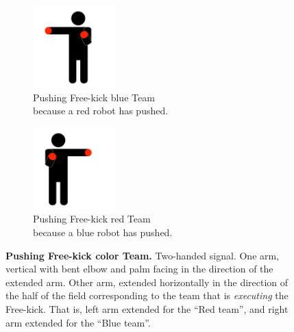 \begin{figure}[ht!]
    \centering
    \begin{subfigure}{.33\textwidth}
        \centering
        \includegraphics[height=120px]{figs/technical_challenges/pushing.png}
        \caption{{\color{blue}Pushing Free-kick \textlangle{}blue\textrangle{} Team}\\ because a {\color{red}red} robot has pushed.}
    \end{subfigure}
    \begin{subfigure}{.33\textwidth}
        \centering
        \includegraphics[height=120px]{figs/technical_challenges/pushing-flipped.png}
        \caption{{\color{red}Pushing Free-kick \textlangle{}red\textrangle{} Team}\\ because a {\color{blue}blue} robot has pushed.}
    \end{subfigure}
    \caption{\textbf{Pushing Free-kick \textlangle{}color\textrangle{} Team.} Two-handed signal. One arm, vertical with bent elbow and palm facing in the direction of the extended arm. Other arm, extended horizontally in the direction of the half of the field corresponding to the team that is \emph{executing} the Free-kick. That is, left arm extended for the ``Red team'', and right arm extended for the ``Blue team''.}
\end{figure}

